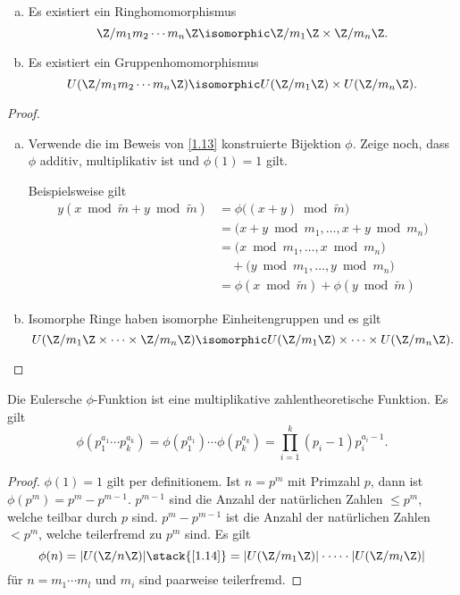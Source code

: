 \begin{st} \label{1.14}
	\begin{enumerate}[a)]
		\item
			Es existiert ein Ringhomomorphismus
			\[
				\Z / m_1m_2 \dotsb m_n \Z
				\isomorphic
				\Z /m_1 \Z \times \Z / m_n \Z.
			\]
		\item
			Es existiert ein Gruppenhomomorphismus
			\[
				U(\Z / m_1 m_2 \dotsb m_n \Z)
				\isomorphic
				U(\Z / m_1 \Z) \times U(\Z / m_n \Z).
			\]
	\end{enumerate}
	\begin{proof}
		\begin{enumerate}[a)]
			\item
				Verwende die im Beweis von \ref{1.13} konstruierte Bijektion $\phi$.
				Zeige noch, dass $\phi$ additiv, multiplikativ ist und $\phi(1) = 1$ gilt.

				Beispielsweise gilt
				\begin{align*}
					y(x \bmod \tilde m + y \bmod \tilde m)
					&= \phi\big( (x+y) \bmod \tilde m \big) \\
					&= \big(x + y \bmod m_1, \dotsc, x + y \bmod m_n \big) \\
					&= \big( x \bmod m_1, \dotsc, x \bmod m_n\big) \\
					&\quad + \big(y \bmod m_1, \dotsc, y \bmod m_n \big) \\
					&= \phi(x \bmod \tilde m) + \phi(y \bmod \tilde m)
				\end{align*}
			\item
				Isomorphe Ringe haben isomorphe Einheitengruppen und es gilt
				\[
					U(\Z / m_1 \Z \times \dotsb \times \Z / m_n \Z)
					\isomorphic U(\Z / m_1 \Z) \times \dotsb \times U(\Z / m_n \Z).
				\]
		\end{enumerate}
	\end{proof}
\end{st}

\begin{kor} \label{1.15}
	Die Eulersche $\phi$-Funktion ist eine multiplikative zahlentheoretische Funktion.
	Es gilt
	\[
		\phi( p_1^{a_1} \dotsb p_k^{a_k} )
		=\phi( p_1^{a_1}) \dotsb \phi(p_k^{a_k})
		= \prod_{i=1}^k (p_i - 1) p_i^{a_i - 1}.
	\]
	\begin{proof}
		$\phi(1) = 1$ gilt per definitionem.
		Ist $n = p^m$ mit Primzahl $p$, dann ist $\phi(p^m) = p^m - p^{m-1}$.
		$p^{m-1}$ sind die Anzahl der natürlichen Zahlen $\le p^m$, welche teilbar durch $p$ sind.
		$p^m - p^{m-1}$ ist die Anzahl der natürlichen Zahlen $< p^m$, welche teilerfremd zu $p^m$ sind.
		Es gilt
		\[
			\phi(n)
			= | U(\Z / n\Z) |
			\stack{\ref{1.14}}= |U(\Z /m _1 \Z) | \cdot \dotsb \cdot | U(\Z /m_l \Z) |
		\]
		für $n = m_1 \dotsb m_l$ und $m_i$ sind paarweise teilerfremd.
	\end{proof}
\end{kor}

